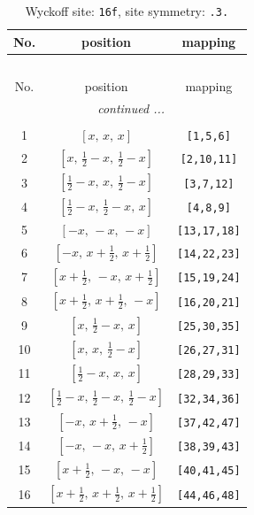 \documentclass[fleqn,8pt]{jsarticle}
\begin{document}
\begin{longtable}{ccc}
\caption{Wyckoff site: {\tt 16f}, site symmetry: {\tt .3.}}
 \\
 \hline \hline
No. & position & mapping \\ \hline \endfirsthead

\multicolumn{2}{l}{\tablename\ \thetable{}} \\
 \hline \hline
No. & position & mapping \\ \hline \endhead

 \hline \hline
\multicolumn{2}{r}{\footnotesize\it continued ...} \\ \endfoot

 \hline \hline
\multicolumn{2}{r}{} \\ \endlastfoot

1 & $\left[ x,\, x,\, x \right]$ & {\tt [1,5,6]} \\ \hline
2 & $\left[ x,\, \frac{1}{2} - x,\, \frac{1}{2} - x \right]$ & {\tt [2,10,11]} \\ \hline
3 & $\left[ \frac{1}{2} - x,\, x,\, \frac{1}{2} - x \right]$ & {\tt [3,7,12]} \\ \hline
4 & $\left[ \frac{1}{2} - x,\, \frac{1}{2} - x,\, x \right]$ & {\tt [4,8,9]} \\ \hline
5 & $\left[ - x,\, - x,\, - x \right]$ & {\tt [13,17,18]} \\ \hline
6 & $\left[ - x,\, x + \frac{1}{2},\, x + \frac{1}{2} \right]$ & {\tt [14,22,23]} \\ \hline
7 & $\left[ x + \frac{1}{2},\, - x,\, x + \frac{1}{2} \right]$ & {\tt [15,19,24]} \\ \hline
8 & $\left[ x + \frac{1}{2},\, x + \frac{1}{2},\, - x \right]$ & {\tt [16,20,21]} \\ \hline
9 & $\left[ x,\, \frac{1}{2} - x,\, x \right]$ & {\tt [25,30,35]} \\ \hline
10 & $\left[ x,\, x,\, \frac{1}{2} - x \right]$ & {\tt [26,27,31]} \\ \hline
11 & $\left[ \frac{1}{2} - x,\, x,\, x \right]$ & {\tt [28,29,33]} \\ \hline
12 & $\left[ \frac{1}{2} - x,\, \frac{1}{2} - x,\, \frac{1}{2} - x \right]$ & {\tt [32,34,36]} \\ \hline
13 & $\left[ - x,\, x + \frac{1}{2},\, - x \right]$ & {\tt [37,42,47]} \\ \hline
14 & $\left[ - x,\, - x,\, x + \frac{1}{2} \right]$ & {\tt [38,39,43]} \\ \hline
15 & $\left[ x + \frac{1}{2},\, - x,\, - x \right]$ & {\tt [40,41,45]} \\ \hline
16 & $\left[ x + \frac{1}{2},\, x + \frac{1}{2},\, x + \frac{1}{2} \right]$ & {\tt [44,46,48]} \\
\end{longtable}
\end{document}
